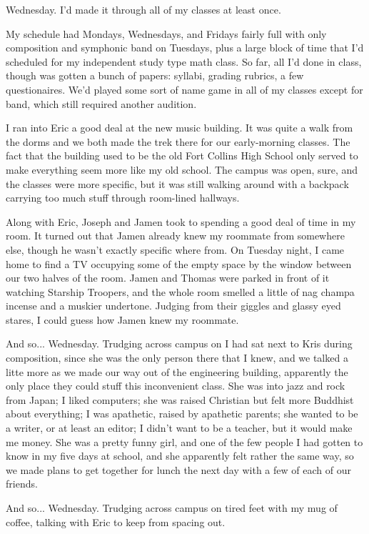 Wednesday.  I'd made it through all of my classes at least once.

My schedule had Mondays, Wednesdays, and Fridays fairly full with only composition and symphonic band on Tuesdays, plus a large block of time that I'd scheduled for my independent study type math class.  So far, all I'd done in class, though was gotten a bunch of papers: syllabi, grading rubrics, a few questionaires.  We'd played some sort of name game in all of my classes except for band, which still required another audition.

I ran into Eric a good deal at the new music building.  It was quite a walk from the dorms and we both made the trek there for our early-morning classes.  The fact that the building used to be the old Fort Collins High School only served to make everything seem more like my old school.  The campus was open, sure, and the classes were more specific, but it was still walking around with a backpack carrying too much stuff through room-lined hallways.

Along with Eric, Joseph and Jamen took to spending a good deal of time in my room.  It turned out that Jamen already knew my roommate from somewhere else, though he wasn't exactly specific where from.  On Tuesday night, I came home to find a TV occupying some of the empty space by the window between our two halves of the room.  Jamen and Thomas were parked in front of it watching Starship Troopers, and the whole room smelled a little of nag champa incense and a muskier undertone.  Judging from their giggles and glassy eyed stares, I could guess how Jamen knew my roommate.

And so... Wednesday.  Trudging across campus on I had sat next to Kris during composition, since she was the only person there that I knew, and we talked a litte more as we made our way out of the engineering building, apparently the only place they could stuff this inconvenient class.  She was into jazz and rock from Japan; I liked computers; she was raised Christian but felt more Buddhist about everything; I was apathetic, raised by apathetic parents; she wanted to be a writer, or at least an editor; I didn't want to be a teacher, but it would make me money.  She was a pretty funny girl, and one of the few people I had gotten to know in my five days at school, and she apparently felt rather the same way, so we made plans to get together for lunch the next day with a few of each of our friends.

And so... Wednesday.  Trudging across campus on tired feet with my mug of coffee, talking with Eric to keep from spacing out.

